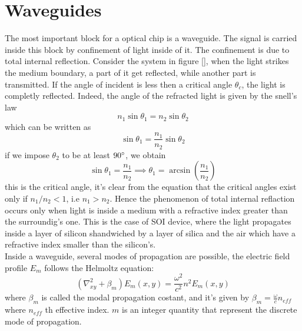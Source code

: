 \documentclass[12pt]{book}
\begin{document}
\section{Waveguides}
The most important block for a optical chip is a waveguide. The signal is carried inside this block by confinement of light inside of it. The confinement is due to total internal reflection. Consider the system in figure [], when the light strikes the medium boundary, a part of it get reflected, while another part is transmitted. If the angle of incident is less then a critical angle $\theta_c$, the light is completly reflected. Indeed, the angle of the refracted light is given by the snell's law
\[n_1 \sin \theta_1 = n_2 \sin \theta_2\]
which can be written as
\[\sin \theta_1 = \frac{n_1}{n_2}\sin \theta_2\]
if we impose $\theta_2$ to be at least $90\degree$, we obtain
\[\sin \theta_1 = \frac{n_1}{n_2} \implies \theta_1 = \arcsin\left(\frac{n_1}{n_2}\right) \]
this is the critical angle, it's clear from the equation that the critical angles exist only if $n_1/n_2<1$, i.e $n_1>n_2$. Hence the phenomenon of total internal reflaction occurs only when light is inside a medium with a refractive index greater than the surroundig's one. This is the case of SOI device, where the light propagates inside a layer of silicon shandwiched by a layer of silica and the air which have a refractive index smaller than the silicon's.\\
Inside a waveguide, several modes of propagation are possible, the electric field profile $E_m$ follows the Helmoltz equation:
\[(\nabla_{xy}^2 + \beta_m)E_m(x,y)= \frac{\omega^2}{c^2}n^2E_m(x,y)\]
where $\beta_m$ is called the modal propagation costant, and it's given by $\beta_m = \frac{\omega}{c}n_{eff}$ where $n_{eff}$ th effective index. $m$ is an integer quantity that represent the discrete mode of propagation.
\end{document}

